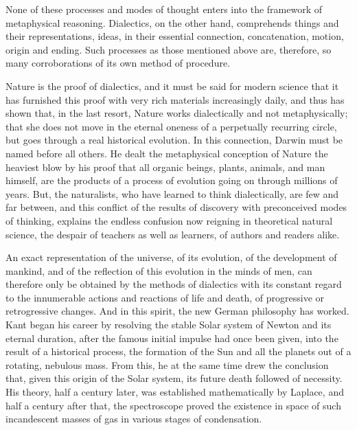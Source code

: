 None of these processes and modes of thought enters into the framework of
metaphysical reasoning. Dialectics, on the other hand, comprehends things and
their representations, ideas, in their essential connection, concatenation,
motion, origin and ending. Such processes as those mentioned above are,
therefore, so many corroborations of its own method of procedure.

Nature is the proof of dialectics, and it must be said for modern science that
it has furnished this proof with very rich materials increasingly daily, and
thus has shown that, in the last resort, Nature works dialectically and not
metaphysically; that she does not move in the eternal oneness of a perpetually
recurring circle, but goes through a real historical evolution. In this
connection, Darwin must be named before all others. He dealt the metaphysical
conception of Nature the heaviest blow by his proof that all organic beings,
plants, animals, and man himself, are the products of a process of evolution
going on through millions of years. But, the naturalists, who have learned to
think dialectically, are few and far between, and this conflict of the results
of discovery with preconceived modes of thinking, explains the endless confusion
now reigning in theoretical natural science, the despair of teachers as well as
learners, of authors and readers alike.

An exact representation of the universe, of its evolution, of the development of
mankind, and of the reflection of this evolution in the minds of men, can
therefore only be obtained by the methods of dialectics with its constant regard
to the innumerable actions and reactions of life and death, of progressive or
retrogressive changes. And in this spirit, the new German philosophy has worked.
Kant began his career by resolving the stable Solar system of Newton and its
eternal duration, after the famous initial impulse had once been given, into the
result of a historical process, the formation of the Sun and all the planets out
of a rotating, nebulous mass. From this, he at the same time drew the conclusion
that, given this origin of the Solar system, its future death followed of
necessity. His theory, half a century later, was established mathematically by
Laplace, and half a century after that, the spectroscope proved the existence in
space of such incandescent masses of gas in various stages of condensation.

